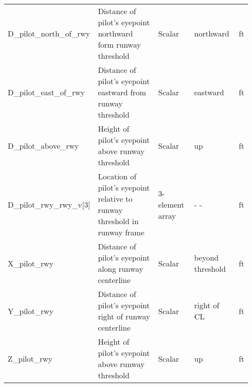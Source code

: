 \documentclass[10pt]{article}
\begin{document}
{\begin{tabular}{|l|p{2.0in}|p{1.0in}|p{1.0in}|l|}
D\_pilot\_north\_of\_rwy & Distance of pilot's eyepoint northward form runway threshold & Scalar & northward & ft \\ 
D\_pilot\_east\_of\_rwy & Distance of pilot's eyepoint eastward from runway threshold & Scalar & eastward & ft \\ 
D\_pilot\_above\_rwy & Height of pilot's eyepoint above runway threshold & Scalar & up & ft \\ 
\hline
D\_pilot\_rwy\_rwy\_v[3] & Location of pilot's eyepoint relative to runway threshold in runway frame & 3-element array &          - - & ft \\ 
X\_pilot\_rwy & Distance of pilot's eyepoint along runway centerline & Scalar & beyond threshold & ft \\ 
Y\_pilot\_rwy & Distance of pilot's eyepoint right of runway centerline & Scalar & right of CL & ft \\ 
Z\_pilot\_rwy & Height of pilot's eyepoint above runway threshold & Scalar & up & ft \\ 
\hline
\end{tabular}
}

\end{document}

